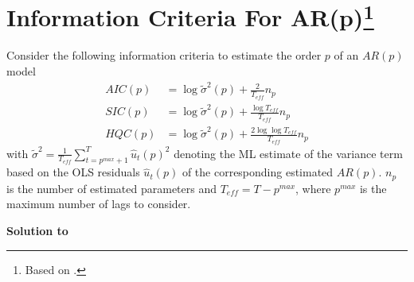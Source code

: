 \documentclass[a4paper]{scrartcl}
\begin{document}
\section[Information Criteria For AR(p)]{Information Criteria For AR(p)\footnote{Based on \citet{Luetkepohl.2004}.}}\label{ex:InfoCriteriaARp}
Consider the following information criteria to estimate the order $p$ of an $AR(p)$ model 
\begin{align*}
AIC(p)  &= \log\tilde{\sigma}^2(p) + \frac{2}{T_{eff}}n_p\\
SIC(p)  &= \log\tilde{\sigma}^2(p) + \frac{\log T_{eff}}{T_{eff}}n_p\\
HQC(p)  &= \log\tilde{\sigma}^2(p) + \frac{2\log \log T_{eff}}{T_{eff}}n_p
\end{align*}
with $\tilde{\sigma}^2=\frac{1}{T_{eff}}\sum_{t={p^{max}+1}}^{T} \hat{u}_t(p)^2$ denoting the ML estimate of the variance term based on the OLS residuals $\hat{u}_t(p)$ of the corresponding estimated $AR(p)$. $n_p$ is the number of estimated parameters and $T_{eff}=T-p^{max}$, where $p^{max}$ is the maximum number of lags to consider.
\begin{solution}\textbf{Solution to }\end{solution}
\end{document}
